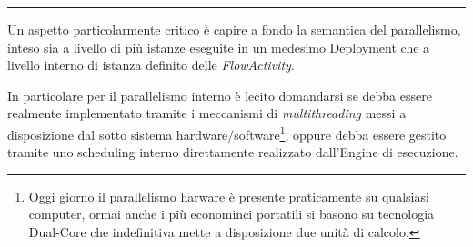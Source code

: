 \rule{7cm}{0.01cm}





Un aspetto particolarmente critico è capire a fondo la semantica del
parallelismo, inteso sia a livello di più istanze eseguite in un medesimo Deployment che a
livello interno di istanza definito delle \emph{FlowActivity}. 

In particolare per il parallelismo interno è lecito domandarsi se debba essere
realmente implementato tramite i meccanismi di \emph{multithreading} messi a
disposizione dal sotto sistema hardware/software\footnote{Oggi giorno il
parallelismo harware è presente praticamente su qualsiasi computer, ormai anche i
più econominci portatili si basono su tecnologia Dual-Core che indefinitiva mette
a disposizione due unità di calcolo.}, oppure debba essere gestito tramite uno
scheduling interno direttamente realizzato dall'Engine di esecuzione.

